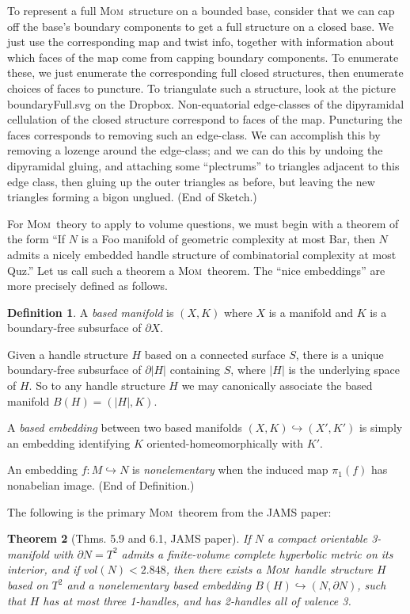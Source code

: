 \documentclass{article}
\theoremstyle{plain}
\newtheorem{theorem}{Theorem}[section]
\theoremstyle{plain}
\theoremstyle{definition}
\newtheorem{definition}[theorem]{Definition}
\numberwithin{equation}{section}
\newcommand{\MOM}{\textsc{Mom}}
\begin{document}
To represent a full \MOM\ structure on a bounded base, 
consider that we can cap off the base's boundary components
to get a full structure on a closed base. We just use the
corresponding map and twist info, together with information about
which faces of the map come from capping boundary components.
To enumerate these, we just enumerate the corresponding
full closed structures, then enumerate choices of faces to puncture.
To triangulate such a structure, look at the picture boundaryFull.svg
on the Dropbox. Non-equatorial edge-classes of the dipyramidal cellulation
of the closed structure correspond to faces of the map. Puncturing
the faces corresponds to removing such an edge-class. We can accomplish
this by removing a lozenge around the edge-class; and we can do this by
undoing the dipyramidal gluing, and attaching some ``plectrums'' to
triangles adjacent to this edge class, then gluing up the outer triangles
as before, but leaving the new triangles forming a bigon unglued.
(End of Sketch.)

For \MOM\ theory to apply to volume questions, we must begin
with a theorem of the form ``If $N$ is a Foo manifold of geometric
complexity at most Bar, then $N$ admits a nicely embedded handle structure of
combinatorial complexity at most Quz.'' Let us
call such a theorem a \MOM\ theorem. The ``nice embeddings''
are more precisely defined as follows.

\begin{definition}
A \emph{based manifold} is $(X,K)$ where $X$ is a manifold
and $K$ is a boundary-free subsurface of $\partial X$.

Given a handle structure $H$ based on a connected
surface $S$, there is a unique boundary-free subsurface
of $\partial |H|$ containing $S$, where $|H|$ is the
underlying space of $H$. So to any handle structure $H$
we may canonically associate the based manifold $B(H) = (|H|, K)$.

A \emph{based embedding} between two based manifolds 
$(X,K) \hookrightarrow (X',K')$ is simply
an embedding identifying $K$ oriented-homeomorphically with $K'$.

An embedding $f: M \hookrightarrow N$ is \emph{nonelementary}
when the induced map $\pi_1(f)$ has nonabelian image.
(End of Definition.)
\end{definition}

The following is the primary \MOM\ theorem from the JAMS paper:

\begin{theorem}[Thms. 5.9 and 6.1, JAMS paper]
If $N$ a compact orientable 3-manifold with $\partial N = T^2$
admits a finite-volume complete hyperbolic metric on its interior,
and if $vol(N) < 2.848$, then there exists a \MOM\ handle structure
$H$ based on $T^2$ and a nonelementary based embedding 
$B(H) \hookrightarrow (N, \partial N)$, such that $H$ has at most
three 1-handles, and has 2-handles all of valence 3.
\end{theorem}
\end{document}
